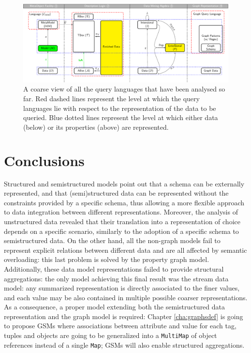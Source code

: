 \begin{figure}[!t]
	\centering
	\includegraphics[width=\textwidth]{fig/02models/taonta}
	\caption{A coarse view of all the query languages that have been analysed so far. Red dashed lines represent the level at  which the query languages lie with respect to the representation of the data to be queried. Blue dotted lines represent the level at which either data (below) or its properties (above) are represented.}
	\label{fig:taonta}
\end{figure}



\newpage
\section{Conclusions}
Structured and semistructured
models point out that a schema can be externally represented, and that (semi)structured data can be represented without the constraints provided by a specific schema, thus allowing a more flexible approach to data integration between different representations. Moreover, the analysis of unstructured data revealed that their translation into a representation of choice depends on a specific scenario, similarly to the adoption of a specific schema to semistructured data.
On the other hand, all the non-graph models fail to represent explicit relations between different data and are all affected by semantic overloading: this last problem is solved by the property graph model. Additionally, these data model representations failed to provide structural aggregations: the only model achieving this final result was the stream data model:  any summarized representation is directly associated to the finer values, and each value may be also contained in multiple possible coarser representations. As a consequence, a proper model extending both the semistructured data representation and the graph model is required: Chapter \vref{cha:graphsdef} is going to propose GSMs where associations between attribute and value for each tag, tuples and objects are going to be generalized into a \texttt{MultiMap} of object references instead of a single \texttt{Map}; GSMs will also enable structured aggregations.

